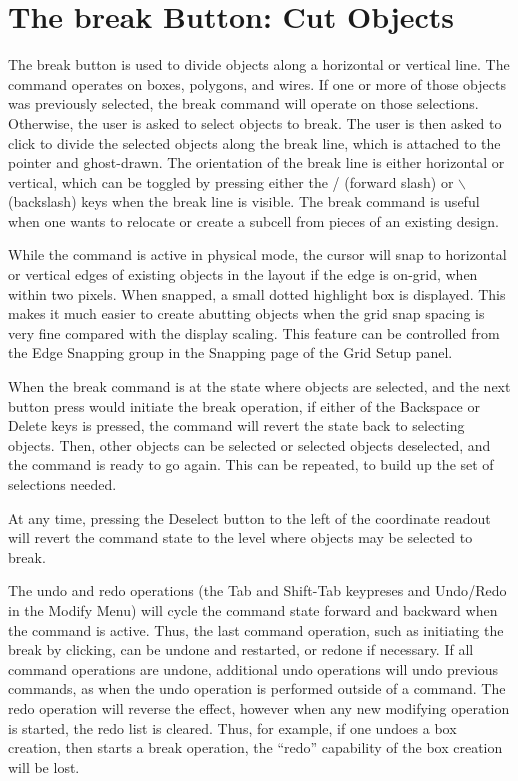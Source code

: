 \section{The {\cb break} Button: Cut Objects}

The {\cb break} button is used to divide objects along a horizontal or
vertical line.  The command operates on boxes, polygons, and wires. 
If one or more of those objects was previously selected, the break
command will operate on those selections.  Otherwise, the user is
asked to select objects to break.  The user is then asked to click to
divide the selected objects along the break line, which is attached to
the pointer and ghost-drawn.  The orientation of the break line is
either horizontal or vertical, which can be toggled by pressing either
the {\cb /} (forward slash) or {\kb $\backslash$} (backslash) keys
when the break line is visible.  The {\cb break} command is useful
when one wants to relocate or create a subcell from pieces of an
existing design.

While the command is active in physical mode, the cursor will snap to
horizontal or vertical edges of existing objects in the layout if the
edge is on-grid, when within two pixels.  When snapped, a small dotted
highlight box is displayed.  This makes it much easier to create
abutting objects when the grid snap spacing is very fine compared with
the display scaling.  This feature can be controlled from the {\cb
Edge Snapping} group in the {\cb Snapping} page of the {\cb Grid
Setup} panel.

When the {\cb break} command is at the state where objects are
selected, and the next button press would initiate the break
operation, if either of the {\kb Backspace} or {\kb Delete} keys is
pressed, the command will revert the state back to selecting objects. 
Then, other objects can be selected or selected objects deselected,
and the command is ready to go again.  This can be repeated, to build
up the set of selections needed.

At any time, pressing the {\cb Deselect} button to the left of the
coordinate readout will revert the command state to the level where
objects may be selected to break.

The undo and redo operations (the {\kb Tab} and {\kb Shift-Tab}
keypreses and {\cb Undo}/{\cb Redo} in the {\cb Modify Menu}) will
cycle the command state forward and backward when the command is
active.  Thus, the last command operation, such as initiating the
break by clicking, can be undone and restarted, or redone if
necessary.  If all command operations are undone, additional undo
operations will undo previous commands, as when the undo operation is
performed outside of a command.  The redo operation will reverse the
effect, however when any new modifying operation is started, the redo
list is cleared.  Thus, for example, if one undoes a box creation,
then starts a break operation, the ``redo'' capability of the box
creation will be lost.


